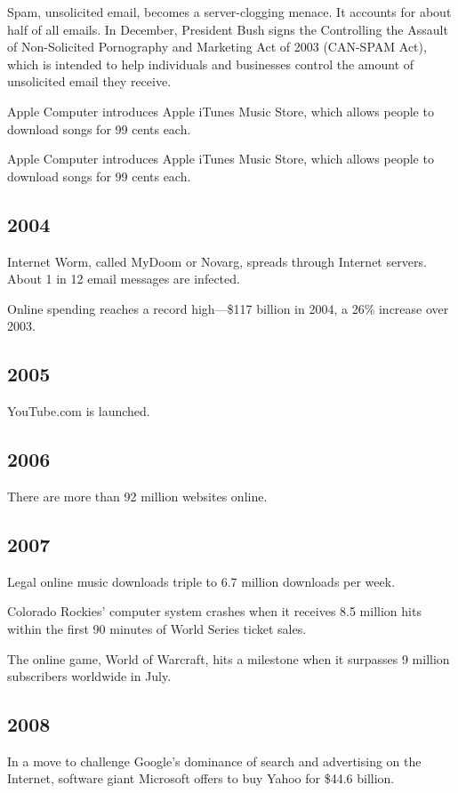 \documentclass[letterpaper,12pt,english]{sphinxmanual}
\begin{document}
Spam, unsolicited email, becomes a server-clogging menace. It accounts for about half of all emails. In December, President Bush signs the Controlling the Assault of Non-Solicited Pornography and Marketing Act of 2003 (CAN-SPAM Act), which is intended to help individuals and businesses control the amount of unsolicited email they receive.

Apple Computer introduces Apple iTunes Music Store, which allows people to download songs for 99 cents each.

Apple Computer introduces Apple iTunes Music Store, which allows people to download songs for 99 cents each.


\subsection{2004}
\label{network-timeline:id23}
Internet Worm, called MyDoom or Novarg, spreads through Internet servers. About 1 in 12 email messages are infected.

Online spending reaches a record high—\$117 billion in 2004, a 26\% increase over 2003.


\subsection{2005}
\label{network-timeline:id24}
YouTube.com is launched.


\subsection{2006}
\label{network-timeline:id25}
There are more than 92 million websites online.


\subsection{2007}
\label{network-timeline:id26}
Legal online music downloads triple to 6.7 million downloads per week.

Colorado Rockies' computer system crashes when it receives 8.5 million hits within the first 90 minutes of World Series ticket sales.

The online game, World of Warcraft, hits a milestone when it surpasses 9 million subscribers worldwide in July.


\subsection{2008}
\label{network-timeline:id27}
In a move to challenge Google's dominance of search and advertising on the Internet, software giant Microsoft offers to buy Yahoo for \$44.6 billion.
\end{document}
